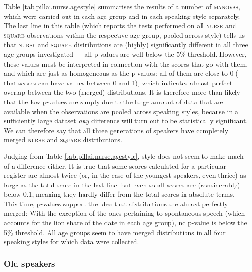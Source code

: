 Table \ref{tab.pillai.nurse.agestyle} summarises the results of a number of \textsc{manovas}, which were carried out in each age group and in each speaking style separately.
The last line in this table (which reports the tests performed on all \textsc{nurse} and \textsc{square} observations within the respective age group, pooled across style) tells us that \textsc{nurse} and \textsc{square} distributions are (highly) significantly different in all three age groups investigated --- all p-values are well below the 5\% threshold.
However, these values must be interpreted in connection with the  scores that go with them, and which are just as homogeneous as the p-values: all of them are close to 0 ( that  scores can have values between 0 and 1), which indicates almost perfect overlap between the two (merged)  distributions.
It is therefore more than likely that the low p-values are simply due to the large amount of data that are available when the observations are pooled across speaking styles, because in a sufficiently large dataset \emph{any} difference will turn out to be statistically significant.
We can therefore say that all three generations of speakers have completely merged \textsc{nurse} and \textsc{square} distributions.

Judging from Table \ref{tab.pillai.nurse.agestyle}, style does not seem to make much of a difference either.
It is true that some  scores calculated for a particular register are almost twice (or, in the case of the youngest speakers, even thrice) as large as the total score in the last line, but even so all  scores are (considerably) below 0.1, meaning they hardly differ from the total scores in absolute terms.
This time, p-values support the idea that distributions are almost perfectly merged: With the exception of the ones pertaining to spontaneous speech (which accounts for the lion share of the date in each age group), no p-value is below the 5\% threshold.
All age groups seem to have merged  distributions in all four speaking styles for which data were collected.

\subsubsection{Old speakers}

